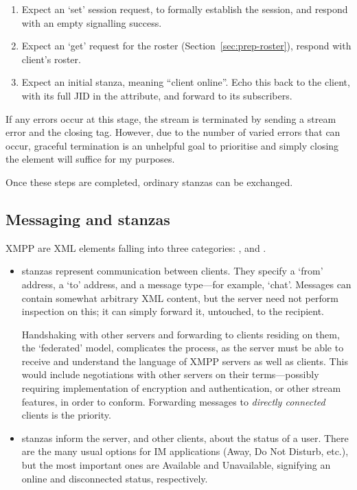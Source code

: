 \documentclass[12pt,a4paper,twoside,openright]{report}
\begin{document}
{\begin{enumerate}
  \item Expect an  `set' session request, to formally establish the session, and respond with an empty  signalling success.

  \item Expect an  `get' request for the roster (Section~\ref{sec:prep-roster}), respond with client's roster.

  \item Expect an initial  stanza, meaning ``client online''. Echo this back to the client, with its full JID in the  attribute, and forward to its subscribers.
\end{enumerate}

If any errors occur at this stage, the stream is terminated by sending a stream error and the closing  tag. However, due to the number of varied errors that can occur, graceful termination is an unhelpful goal to prioritise and simply closing the  element will suffice for my purposes.

Once these steps are completed, ordinary stanzas can be exchanged.

\subsection{Messaging and stanzas}
XMPP  are XML elements falling into three categories: ,  and .

\begin{itemize}
  \item {} stanzas represent communication between clients. They specify a `from' address, a `to' address, and a message type---for example, `chat'. Messages can contain somewhat arbitrary XML content, but the server need not perform inspection on this; it can simply forward it, untouched, to the recipient.

  Handshaking with other servers and forwarding to clients residing on them, the `federated' model, complicates the process, as the server must be able to receive and understand the language of XMPP servers as well as clients. This would include negotiations with other servers on their terms---possibly requiring implementation of encryption and authentication, or other stream features, in order to conform. Forwarding messages to \emph{directly connected} clients is the priority.

  \item {} stanzas inform the server, and other clients, about the status of a user. There are the many usual options for IM applications (Away, Do Not Disturb, etc.), but the most important ones are Available and Unavailable, signifying an online and disconnected status, respectively.


\end{itemize}}
\end{document}
